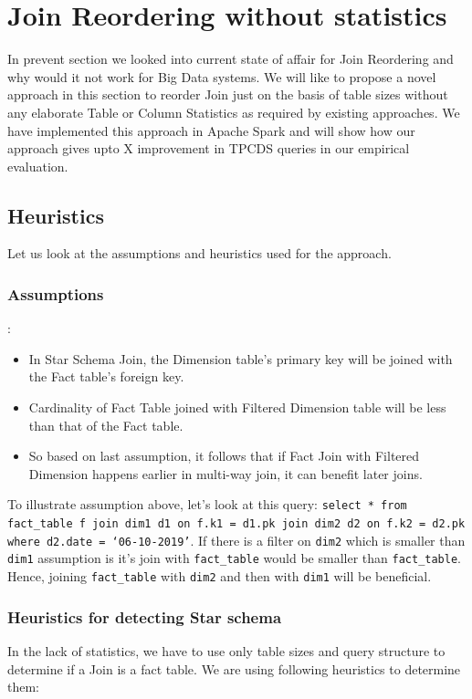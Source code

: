 \section{Join Reordering without statistics}
In prevent section we looked into current state of affair for Join Reordering and why would it not work for Big Data systems. We will like to propose a novel approach in this section to reorder Join just on the basis of table sizes without any elaborate Table or Column Statistics as required by existing approaches.
We have implemented this approach in Apache Spark and will show how our approach gives upto X improvement in TPCDS queries in our empirical evaluation.

\subsection{Heuristics}

Let us look at the assumptions and heuristics used for the approach.

\subsubsection{Assumptions}\label{subsubsec:assumption}:

\begin{itemize}
\item In Star Schema Join, the Dimension table’s primary key will be joined with the Fact table’s foreign key.
\item Cardinality of Fact Table joined with Filtered Dimension table will be less than that of the Fact table.
\item So based on last assumption, it follows that if Fact Join with Filtered Dimension happens earlier in multi-way join, it can benefit later joins.
\end{itemize}

To illustrate assumption above, let's look at this query:
\texttt{select * from fact\_table f join dim1 d1 on f.k1 = d1.pk join dim2 d2 on f.k2 = d2.pk where d2.date = ‘06-10-2019’}. If there is a filter on \texttt{dim2} which is smaller than \texttt{dim1} assumption is it’s join with \texttt{fact\_table} would be smaller than \texttt{fact\_table}. Hence, joining \texttt{fact\_table} with \texttt{dim2} and then with \texttt{dim1} will be beneficial.

\subsubsection{Heuristics for detecting Star schema}
In the lack of statistics, we have to use only table sizes and query structure to determine if a Join is a fact table. We are using following heuristics to determine them:

